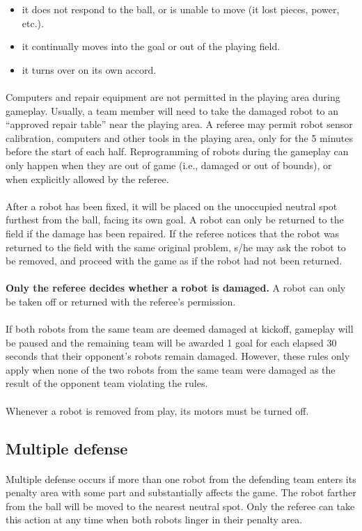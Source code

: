 \documentclass{article}
\newcommand*{\p}{\paragraph{}}
\begin{document}
\begin{itemize}

\item it does not respond to the ball, or is unable to move (it lost pieces,
    power, etc.).

\item it continually moves into the goal or out of the playing field.

\item it turns over on its own accord.

\end{itemize}

\p Computers and repair equipment are not permitted in the playing area during
gameplay. Usually, a team member will need to take the damaged robot to an
``approved repair table'' near the playing area. A referee may permit robot
sensor calibration, computers and other tools in the playing area, only for the
5 minutes before the start of each half. Reprogramming of robots during the
gameplay can only happen when they are out of game (i.e., damaged or out of
bounds), or when explicitly allowed by the referee.

\p After a robot has been fixed, it will be placed on the unoccupied neutral
spot furthest from the ball, facing its own goal. A robot can only be returned
to the field if the damage has been repaired. If the referee notices that the
robot was returned to the field with the same original problem, s/he may ask
the robot to be removed, and proceed with the game as if the robot had not been
returned.

\p \textbf{Only the referee decides whether a robot is damaged.} A robot can only
be taken off or returned with the referee's permission.

\p If both robots from the same team are deemed damaged at kickoff, gameplay
will be paused and the remaining team will be awarded 1 goal for each elapsed
30 seconds that their opponent's robots remain damaged. However, these rules
only apply when none of the two robots from the same team were damaged as the
result of the opponent team violating the rules.

\p Whenever a robot is removed from play, its motors must be turned off.

\subsection{Multiple defense \label{ref-013}}

\p Multiple defense occurs if more than one robot from the defending team enters
its penalty area with some part and substantially affects the game. The robot
farther from the ball will be moved to the nearest neutral spot.
Only the referee can take this action at any time when both
robots linger in their penalty area.
\end{document}
